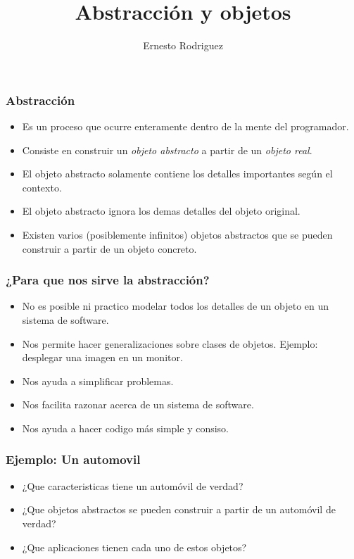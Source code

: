 \documentclass{beamer}
\title[Git]{Abstracci\'on y objetos}
\author{Ernesto Rodriguez}
\institute{
    Universidad del Itsmo \\
    \medskip \textit{erodriguez@unis.edu.gt}
}
\date[\today]{}
\begin{document}
\begin{frame}
\titlepage
\end{frame}

\begin{frame}
\frametitle{Abstracci\'on}
\begin{itemize}
    \item Es un proceso que ocurre enteramente dentro de la mente del programador.
    \item Consiste en construir un \emph{objeto abstracto} a partir de un \emph{objeto real}.
    \item El objeto abstracto solamente contiene los detalles importantes seg\'un el contexto.
    \item El objeto abstracto ignora los demas detalles del objeto original.
    \item Existen varios (posiblemente infinitos) objetos abstractos que se pueden construir a partir de un objeto concreto.
\end{itemize}
\end{frame}

\begin{frame}
    \frametitle{¿Para que nos sirve la abstracci\'on?}
    \begin{itemize}
        \item{No es posible ni practico modelar todos los detalles de un objeto en un sistema de software.}
        \item{Nos permite hacer generalizaciones sobre clases de objetos. Ejemplo: desplegar una imagen en un monitor.}
        \item{Nos ayuda a simplificar problemas.}
        \item{Nos facilita razonar acerca de un sistema de software.}
        \item{Nos ayuda a hacer codigo m\'as simple y consiso.}
    \end{itemize}
\end{frame}

\begin{frame}
    \frametitle{Ejemplo: Un automovil}
    \begin{itemize}
        \item{¿Que caracteristicas tiene un autom\'ovil de verdad?}
        \item{¿Que objetos abstractos se pueden construir a partir de un autom\'ovil de verdad?}
        \item{¿Que aplicaciones tienen cada uno de estos objetos?}
    \end{itemize}
\end{frame}
\end{document}
